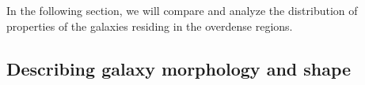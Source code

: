 \documentclass[twocolumn,useAMS,usenatbib]{mn2e}
\newcommand{\rachel}[1]{}
\newcommand{\arun}[1]{}
\begin{document}

In the following section, we will compare and analyze the distribution of properties of the galaxies residing in the overdense regions.

\arun{Talk more about environments - Nature and nurture?}
\rachel{What do you have in mind here?}

\subsection{Describing galaxy morphology and shape}
\label{sub:axisratio}

% 

\rachel{In my opinion, given that the main results are from Claire's
  fits, you should describe those {\em first} and then put the
  re-Gaussianization description second.  Also, state this plan up
  front, i.e., something like ``To describe galaxy morphology and
  shape, we will use fits to Sersic profiles. (\dots description here
  \dots)  However, as a secondary check on the results, we will use \dots''}
\end{document}
